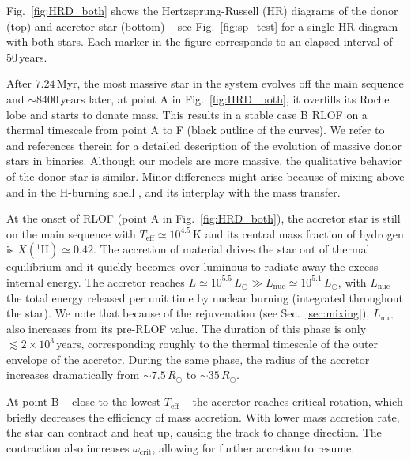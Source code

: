 \documentclass[twocolumn,twocolappendix,trackchanges]{aastex63}
\DeclareRobustCommand{\Figref}[1]{Fig.~\ref{#1}}
\DeclareRobustCommand{\Secref}[1]{Sec.~\ref{#1}}
\begin{document}
\Figref{fig:HRD_both} shows the Hertzsprung-Russell (HR) diagrams of
the donor (top) and accretor star (bottom) -- see \Figref{fig:sp_test} for a single HR
diagram with both stars. Each marker in the figure
corresponds to an elapsed interval of 50\,years.

After $7.24$\,Myr, the most massive star in the system
 evolves off the main sequence and $\sim{}8400$\,years later, at
point A in \Figref{fig:HRD_both}, it overfills its Roche lobe and starts to donate mass. This
results in a stable case B RLOF on a thermal timescale from point A to
F (black outline of the curves).
We refer to \cite{gotberg:17, klencki:20, laplace:21,
blagorodnova:21} and references therein for a detailed description
of the evolution of massive donor stars in binaries.  Although our
models are more massive, the qualitative behavior of the donor star
is similar. Minor differences might arise because of mixing above
and in the H-burning shell \citep[e.g.,][]{schootemeijer:19,
klencki:21}, and its interplay with the mass transfer.

At the onset of RLOF (point A in \Figref{fig:HRD_both}), the accretor
star is still on the main sequence with
$T_\mathrm{eff}\simeq10^{4.5}$\,K and its central mass fraction of
hydrogen is $X(^1\mathrm{H})\simeq 0.42$. The accretion of material
drives the star out of thermal equilibrium and it quickly becomes
over-luminous to radiate away the excess internal energy. The accretor
reaches
$L\simeq10^{5.5}\,L_\odot\gg L_\mathrm{nuc}\simeq 10^{5.1}\,L_\odot$,
with $L_\mathrm{nuc}$ the total energy released per unit time by
nuclear burning (integrated throughout the star). We note that because
of the rejuvenation (see \Secref{sec:mixing}), $L_\mathrm{nuc}$ also
increases from its pre-RLOF value. The
duration of this phase is only $\lesssim 2\times 10^3$\,years,
corresponding roughly to the thermal timescale of the outer envelope
of the accretor. During the same phase, the radius of the
accretor increases dramatically from $\sim{}7.5\,R_\odot$ to
$\sim{}35\,R_\odot$.

At point B -- close to the lowest $T_\mathrm{eff}$ --
the accretor reaches critical rotation, which briefly decreases the
efficiency of mass accretion. With lower mass accretion rate, the star can contract and heat up, causing the track to change direction. The contraction also increases
$\omega_\mathrm{crit}$, allowing for further accretion to resume.
\end{document}

